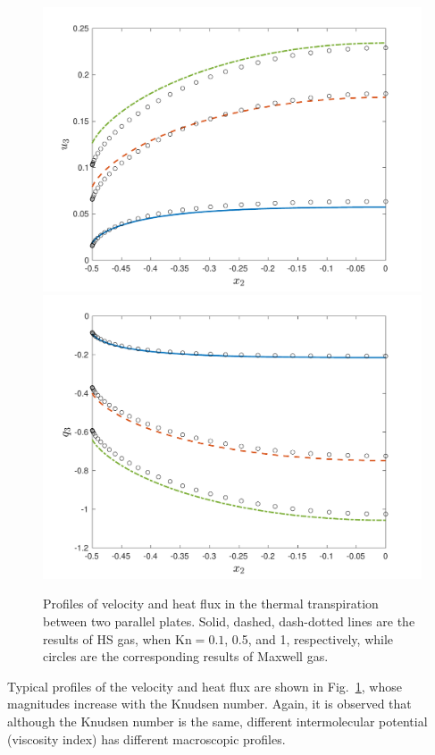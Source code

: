 \begin{figure}[t]
	\centering
	{\includegraphics[scale=0.45]{LinearizedBol/IMG/Transpiration_1D.pdf}} 	{\includegraphics[scale=0.45]{LinearizedBol/IMG/Transpiration_1D2.pdf}}
	\caption{
		Profiles of velocity and heat flux in the thermal transpiration between two parallel plates. Solid, dashed, dash-dotted lines are the results of HS gas, when $\text{Kn}=0.1$, 0.5, and 1, respectively, while circles are the corresponding results of Maxwell gas.
	} 
	\label{Transpiration_massheat}
\end{figure}


Typical profiles of the velocity and heat flux are shown in Fig.~\ref{Transpiration_massheat}, whose magnitudes increase with the Knudsen number. Again, it is observed that although the Knudsen number is the same, different intermolecular potential (viscosity index) has different macroscopic profiles. 



